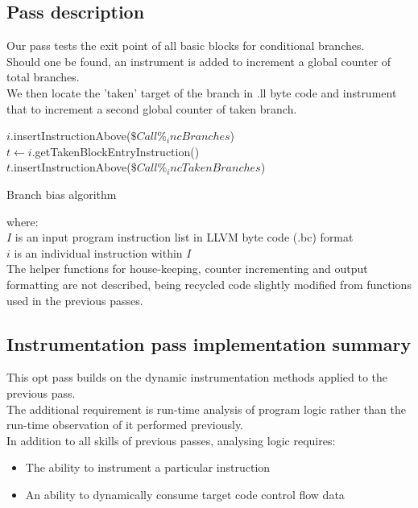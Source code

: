 \subsection{Pass description}
Our pass tests the exit point of all basic blocks for conditional branches.\\
Should one be found, an instrument is added to increment a global counter of total branches.\\
We then locate the 'taken' target of the branch in .ll byte code and instrument that to increment a second global counter of taken branch.\\
\begin{algorithm}
 { 
 	{
 		$i$.insertInstructionAbove($\$Call \%_incBranches$)\\
 		$t \gets i$.getTakenBlockEntryInstruction()\\
 		$t$.insertInstructionAbove($\$Call \%_incTakenBranches$)\\
 		 		 
 	}
 }

 \caption{Branch bias algorithm}
\end{algorithm}
where:\\
$I$ is an input program instruction list in LLVM byte code (.bc) format\\
$i$ is an individual instruction within $I$\\


The helper functions for house-keeping, counter incrementing and output formatting are not described, being recycled code slightly modified from functions used in the previous passes.\\ 

\subsection{Instrumentation pass implementation summary}
This opt pass builds on the dynamic instrumentation methods applied to the previous pass.\\
The additional requirement is run-time analysis of program logic rather than the run-time observation of it performed previously.\\
In addition to all skills of previous passes, analysing logic requires:\\ 
\begin{itemize}
\item The ability to instrument a particular instruction
\item An ability to dynamically consume target code control flow data
\end{itemize}

